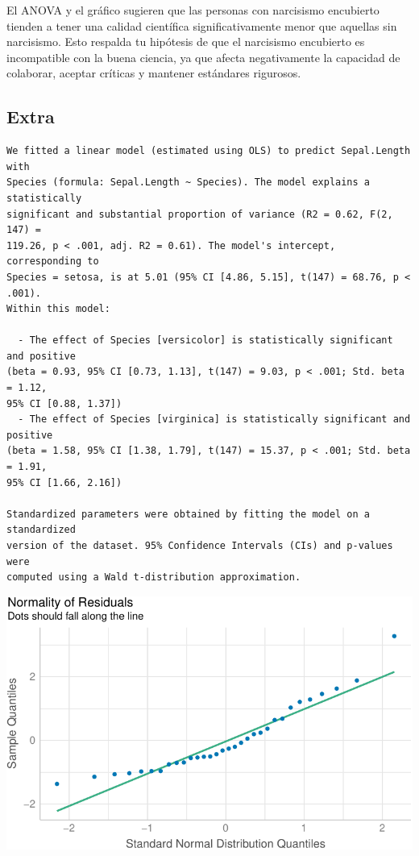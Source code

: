 \documentclass[
]{article}
\begin{document}
El ANOVA y el gráfico sugieren que las personas con narcisismo
encubierto tienden a tener una calidad científica significativamente
menor que aquellas sin narcisismo. Esto respalda tu hipótesis de que el
narcisismo encubierto es incompatible con la buena ciencia, ya que
afecta negativamente la capacidad de colaborar, aceptar críticas y
mantener estándares rigurosos.

\subsection{Extra}\label{extra}

\begin{verbatim}
We fitted a linear model (estimated using OLS) to predict Sepal.Length with
Species (formula: Sepal.Length ~ Species). The model explains a statistically
significant and substantial proportion of variance (R2 = 0.62, F(2, 147) =
119.26, p < .001, adj. R2 = 0.61). The model's intercept, corresponding to
Species = setosa, is at 5.01 (95% CI [4.86, 5.15], t(147) = 68.76, p < .001).
Within this model:

  - The effect of Species [versicolor] is statistically significant and positive
(beta = 0.93, 95% CI [0.73, 1.13], t(147) = 9.03, p < .001; Std. beta = 1.12,
95% CI [0.88, 1.37])
  - The effect of Species [virginica] is statistically significant and positive
(beta = 1.58, 95% CI [1.38, 1.79], t(147) = 15.37, p < .001; Std. beta = 1.91,
95% CI [1.66, 2.16])

Standardized parameters were obtained by fitting the model on a standardized
version of the dataset. 95% Confidence Intervals (CIs) and p-values were
computed using a Wald t-distribution approximation.
\end{verbatim}

\includegraphics{template_files/figure-pdf/unnamed-chunk-6-1.pdf}
\end{document}
